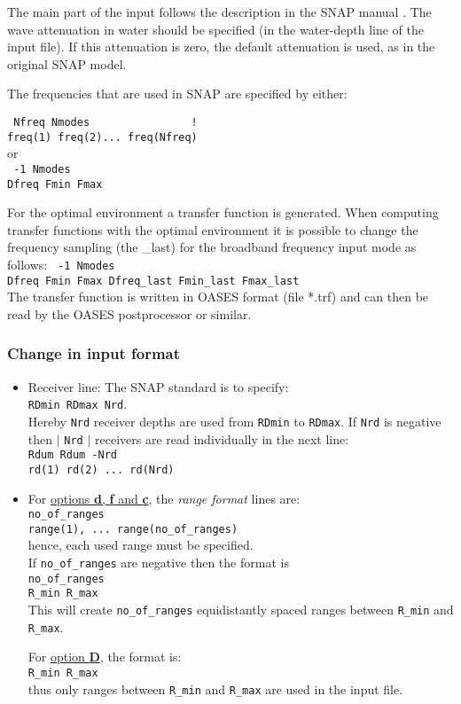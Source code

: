 \documentclass{saclantc}
\begin{document}
The main part of the input follows the description in the {\sf SNAP} manual
\cite{snap}. The wave attenuation in 
water should be specified (in the water-depth line of the input file). 
If this attenuation is zero, the default attenuation
is used, as in the original {\sf SNAP} model.

The frequencies that are used in {\sf SNAP} 
are specified by either:

{\tt
Nfreq  Nmodes~~~~~~~~~~~~~~~     ! \\
freq(1) freq(2)... freq(Nfreq)\\
}
or \\
{\tt
-1  Nmodes\\
Dfreq Fmin Fmax\\
}

For the optimal environment a transfer function is generated. 
When computing transfer functions with the optimal environment
it is possible to change the frequency sampling (the \_last) 
for the broadband frequency input mode as follows:
{\tt
-1  Nmodes\\
Dfreq Fmin Fmax  Dfreq\_last Fmin\_last Fmax\_last\\
}
The transfer function is written in {\sf OASES} format (file *.trf) and can then be read by the  {\sf OASES} postprocessor or similar.


\subsubsection{Change in input format}
\begin{itemize}

\item Receiver line: The {\sf SNAP} standard is to specify: \\
{\tt RDmin RDmax Nrd}.\\
Hereby {\tt  Nrd} receiver depths are used from {\tt RDmin} to {\tt RDmax}.
 If {\tt Nrd} is negative then $\mid$ {\tt Nrd} $\mid$ receivers are 
read individually in the next line:\\
{\tt Rdum Rdum -Nrd} \\
{\tt rd(1) rd(2) ... rd(Nrd) }
\item For \underline{options {\bf d}, {\bf f} and {\bf c}}, the {\it
range format} lines are:\\
{\tt no\_of\_ranges}\\
{\tt range(1), ... range(no\_of\_ranges)}\\
hence, each used range must be specified.\\
If {\tt no\_of\_ranges} are negative then the format is \\
{\tt  no\_of\_ranges}\\
{\tt R\_min R\_max}\\
This will create {\tt no\_of\_ranges} equidistantly spaced ranges between {\tt R\_min} and {\tt R\_max}.
 
For \underline{option {\bf D}},
the format is:\\
{\tt R\_min R\_max}\\
thus only ranges between {\tt R\_min} and {\tt R\_max} are used in the
input file. 
\end{itemize}
\end{document}
